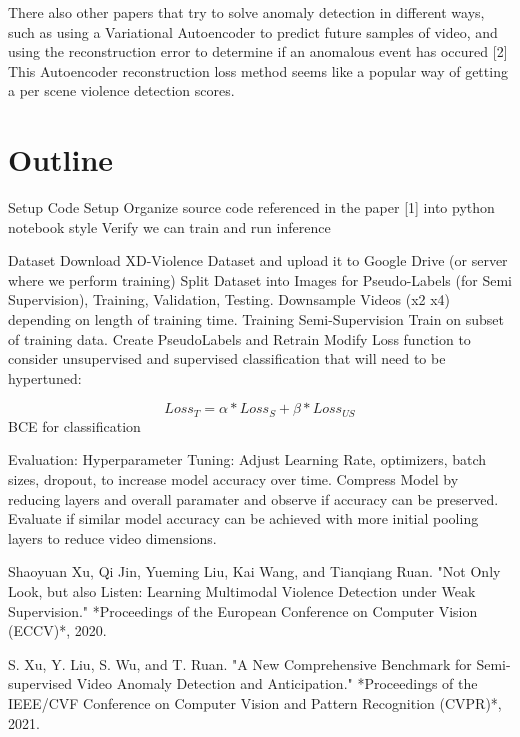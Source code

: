 \documentclass[twocolumn]{article}
\begin{document}
	There also other papers that try to solve anomaly detection in different ways, such as using a 
	Variational Autoencoder to predict future samples of video, and using the reconstruction error to 
	determine if an anomalous event has occured [2] This Autoencoder reconstruction loss
	method seems like a popular way of getting a per scene violence detection 
	scores. 
	
	\section{Outline}

	\begin{outline}
		\1 Setup
		   \2 Code Setup
				\3 Organize source code referenced in the paper [1] into python notebook style
				\3 Verify we can train and run inference
			
		  \2 Dataset
				\3 Download XD-Violence Dataset and upload it to Google Drive (or server where we 
				perform training)
				\3 Split Dataset into Images for Pseudo-Labels (for Semi Supervision), Training, Validation, Testing. 
				\3 Downsample Videos (x2 x4) depending on length of training time.
		\1 Training
			\2 Semi-Supervision
				\3 Train on subset of training data. 
				\3 Create PseudoLabels and Retrain
				\3 Modify Loss function to consider unsupervised and supervised 
				classification that will need to be hypertuned:

				\[Loss_T  = \alpha * Loss_S + \beta * Loss_{US}\]
				\3 BCE for classification

		\1 Evaluation: 
		\2 Hyperparameter Tuning:
		 Adjust Learning Rate, optimizers, batch sizes, dropout, to increase
		model accuracy over time. 
		\2 Compress Model by reducing layers and overall paramater and observe 
		if accuracy can be preserved.
		\3 Evaluate if similar model accuracy can be achieved with more initial 
		pooling layers to reduce video dimensions.
				
	 \end{outline}
	
	
	\begin{thebibliography}{9}
		Shaoyuan Xu, Qi Jin, Yueming Liu, Kai Wang, and Tianqiang Ruan. "Not Only Look, but also Listen: Learning Multimodal Violence Detection under Weak Supervision." *Proceedings of the European Conference on Computer Vision (ECCV)*, 2020.

		S. Xu, Y. Liu, S. Wu, and T. Ruan. "A New Comprehensive Benchmark for Semi-supervised Video Anomaly Detection and Anticipation." *Proceedings of the IEEE/CVF Conference on Computer Vision and Pattern Recognition (CVPR)*, 2021.


		\end{thebibliography}
\end{document}
